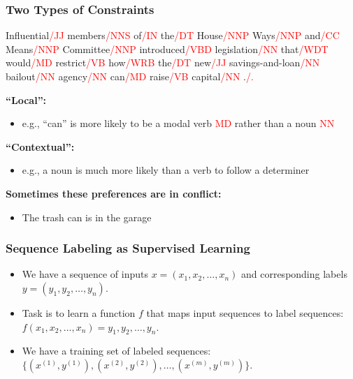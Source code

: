 \documentclass[handout]{beamer}
\begin{document}
\begin{frame}
  \frametitle{Two Types of Constraints}
  Influential\textcolor{red}{/JJ} members\textcolor{red}{/NNS} of\textcolor{red}{/IN} the\textcolor{red}{/DT} House\textcolor{red}{/NNP} Ways\textcolor{red}{/NNP} and\textcolor{red}{/CC} Means\textcolor{red}{/NNP} Committee\textcolor{red}{/NNP} introduced\textcolor{red}{/VBD} legislation\textcolor{red}{/NN} that\textcolor{red}{/WDT} would\textcolor{red}{/MD} restrict\textcolor{red}{/VB} how\textcolor{red}{/WRB} the\textcolor{red}{/DT} new\textcolor{red}{/JJ} savings-and-loan\textcolor{red}{/NN} bailout\textcolor{red}{/NN} agency\textcolor{red}{/NN} can\textcolor{red}{/MD} raise\textcolor{red}{/VB} capital\textcolor{red}{/NN} .\textcolor{red}{/.} \vspace{0.5cm}

  \textbf{``Local'':}
  \begin{itemize}
    \item e.g., ``can'' is more likely to be a modal verb \textcolor{red}{MD} rather than a noun \textcolor{red}{NN}
  \end{itemize}

  \textbf{``Contextual'':}
  \begin{itemize}
    \item e.g., a noun is much more likely than a verb to follow a determiner
  \end{itemize}

  \textbf{Sometimes these preferences are in conflict:}
  \begin{itemize}
    \item The trash can is in the garage
  \end{itemize}
\end{frame}


\begin{frame}
  \frametitle{Sequence Labeling as Supervised Learning}

    \begin{itemize}
      \item We have a sequence of inputs $x = (x_1, x_2, \ldots, x_n)$ and corresponding labels $y = (y_1, y_2, \ldots, y_n)$.
      \item Task is to learn a function $f$ that maps input sequences to label sequences: $f(x_1,x_2, \ldots, x_n) = y_1, y_2, \ldots, y_n$.
      \item We have a training set of labeled sequences: $\{(x^{(1)}, y^{(1)}), (x^{(2)}, y^{(2)}), \ldots, (x^{(m)}, y^{(m)})\}$.
    \end{itemize}
  
\end{frame}
\end{document}
